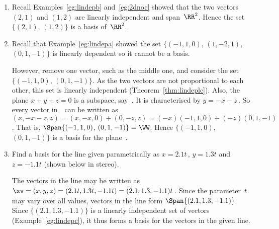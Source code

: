 \begin{example} \label{eg:}
\begin{enumerate}
\item Recall Examples~\ref{eg:lindepb} and~\ref{eg:2dnoc} showed that the two vectors \((2,1)\) and \((1,2)\) are linearly independent and span~\(\RR^2\). 
Hence the set \(\{(2,1),\, (1,2)\}\) is a basis of~\(\RR^2\).

\item Recall that Example~\ref{eg:lindepa} showed the set \(\{(-1,1,0)\), \((1,-2,1)\), \((0,1,-1)\}\) is linearly dependent so it cannot be a basis.

However, remove one vector, such as the middle one, and consider the set \(\{(-1,1,0)\), \((0,1,-1)\}\).
As the two vectors are not proportional to each other, this set is linearly independent (Theorem~\ref{thm:lindeplc}).
Also, the plane \(x+y+z=0\) is a subspace, say~\WW.
It is characterised by \(y=-x-z\)\,.
So every vector in~\WW\ can be written as \((x,-x-z,z)=(x,-x,0)+(0,-z,z)=(-x)(-1,1,0)+(-z)(0,1,-1)\). 
That is, \(\Span\{(-1,1,0)\), \((0,1,-1)\}=\WW\).
Hence \(\{(-1,1,0)\), \((0,1,-1)\}\) is a basis for the plane~\WW.

\item Find a basis for the line given parametrically as \(x=2.1t\)\,, \(y=1.3t\) and \(z=-1.1t\) (shown below in stereo).
\begin{center}
 {}
\end{center}
\begin{solution} 
The vectors in the line may be written as \(\xv=(x,y,z) =(2.1t,1.3t,-1.1t) =(2.1,1.3,-1.1)t\)\,.
Since the parameter~\(t\) may vary over all values, vectors in the line form \(\Span\{(2.1,1.3,-1.1)\}\). 
Since \(\{(2.1,1.3,-1.1)\}\) is a linearly independent set of vectors (Example~\ref{eg:lindepc}), it thus forms a basis for the vectors in the given line.
\end{solution}



\end{enumerate}
\end{example}

